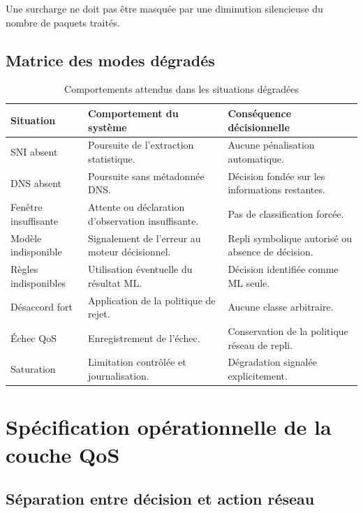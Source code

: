 Une surcharge ne doit pas être masquée par une diminution silencieuse du nombre de paquets traités.

\subsection{Matrice des modes dégradés}

\begin{table}[H]
\centering
\caption{Comportements attendus dans les situations dégradées}
\label{tab:modes_degrades}
\small
\begin{tabularx}{\textwidth}{|X|X|X|}
\hline
\textbf{Situation} & \textbf{Comportement du système} & \textbf{Conséquence décisionnelle} \\
\hline
SNI absent &
Poursuite de l'extraction statistique. &
Aucune pénalisation automatique. \\
\hline
DNS absent &
Poursuite sans métadonnée DNS. &
Décision fondée sur les informations restantes. \\
\hline
Fenêtre insuffisante &
Attente ou déclaration d'observation insuffisante. &
Pas de classification forcée. \\
\hline
Modèle indisponible &
Signalement de l'erreur au moteur décisionnel. &
Repli symbolique autorisé ou absence de décision. \\
\hline
Règles indisponibles &
Utilisation éventuelle du résultat ML. &
Décision identifiée comme ML seule. \\
\hline
Désaccord fort &
Application de la politique de rejet. &
Aucune classe arbitraire. \\
\hline
Échec QoS &
Enregistrement de l'échec. &
Conservation de la politique réseau de repli. \\
\hline
Saturation &
Limitation contrôlée et journalisation. &
Dégradation signalée explicitement. \\
\hline
\end{tabularx}
\end{table}

\section{Spécification opérationnelle de la couche QoS}

\subsection{Séparation entre décision et action réseau}

